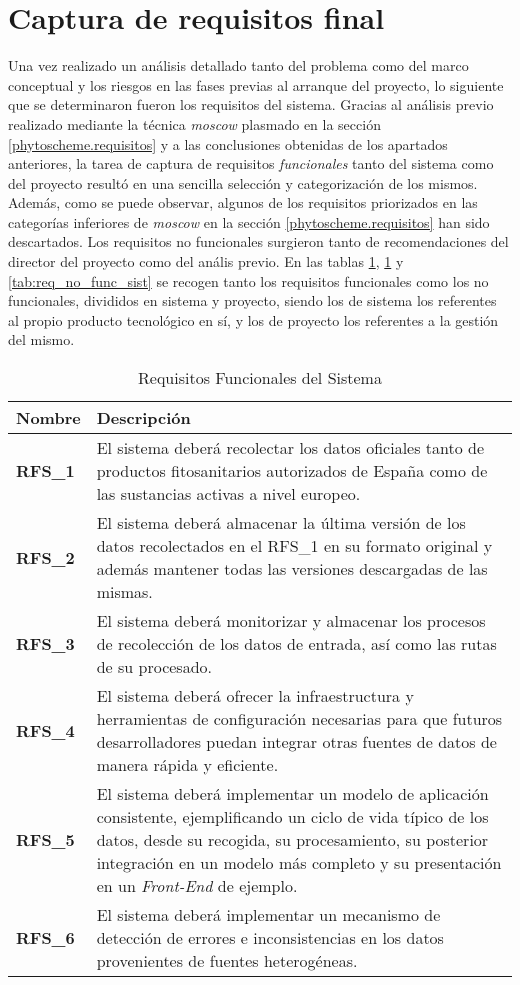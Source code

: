 \section{Captura de requisitos final}  \label{analisis.requisitos}
Una vez realizado un análisis detallado tanto del problema como del marco conceptual y los riesgos en las fases previas al arranque del proyecto, lo  siguiente que se determinaron fueron los requisitos del sistema. Gracias al análisis previo realizado mediante la técnica \textit{\gls{moscow}} plasmado en la sección \ref{phytoscheme.requisitos} y a las conclusiones obtenidas de los apartados anteriores, la tarea de captura de requisitos \textit{funcionales} tanto del sistema como del proyecto resultó en una sencilla selección y categorización de los mismos. Además, como se puede observar, algunos de los requisitos priorizados en las categorías inferiores de \textit{\gls{moscow}} en la sección \ref{phytoscheme.requisitos} han sido descartados. Los requisitos no funcionales surgieron tanto de recomendaciones del director del proyecto como del anális previo. En las tablas \ref{tab:req_func_sist}, \ref{tab:req_func_sist} y \ref{tab:req_no_func_sist} se recogen tanto los requisitos funcionales como los no funcionales, divididos en sistema y proyecto, siendo los de sistema los referentes al propio producto tecnológico en sí, y los de proyecto los referentes a la gestión del mismo. 
\par
\begin{table}[!h]
\centering
\bgroup
\def\arraystretch{1.3}
\begin{tabular}{l p{13cm}}
\toprule
\textbf{Nombre} & \textbf{Descripción} \\
 \midrule
\textbf{RFS\_1} & 
El sistema deberá recolectar los datos oficiales tanto de productos fitosanitarios autorizados de España como de las sustancias activas a nivel europeo.
 \\
\textbf{RFS\_2} & 
El sistema deberá almacenar la última versión de los datos recolectados en el RFS\_1 en su formato original y además mantener todas las versiones descargadas de las mismas. 
 \\
\textbf{RFS\_3} & 
El sistema deberá monitorizar y almacenar los procesos de recolección de los datos de entrada, así como las rutas de su procesado. 
 \\
\textbf{RFS\_4} & 
El sistema deberá ofrecer la infraestructura y herramientas de configuración necesarias para que futuros desarrolladores puedan integrar otras fuentes de datos de manera rápida y eficiente. 
 \\
\textbf{RFS\_5} & 
El sistema deberá implementar un modelo de aplicación consistente, ejemplificando un ciclo de vida típico de los datos, desde su recogida, su procesamiento, su posterior integración en un modelo más completo y su presentación en un \textit{Front-End} de ejemplo.
 \\
\textbf{RFS\_6} & 
El sistema deberá implementar un mecanismo de detección de errores e inconsistencias en los datos provenientes de fuentes heterogéneas.
 \\
\bottomrule
\end{tabular}
\egroup
\caption{Requisitos Funcionales del Sistema}
\label{tab:req_func_sist}
\end{table}

